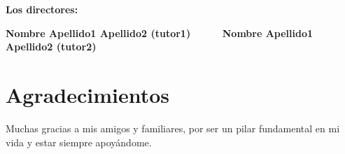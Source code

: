 \textbf{Los directores:}

\vspace{5cm}

\noindent \textbf{Nombre Apellido1 Apellido2 (tutor1) \ \ \ \ \ Nombre Apellido1 Apellido2 (tutor2)}

\chapter*{Agradecimientos}
\thispagestyle{empty}

       \vspace{1cm}


Muchas gracias a mis amigos y familiares, por ser un pilar fundamental en mi vida y estar siempre apoyándome.

